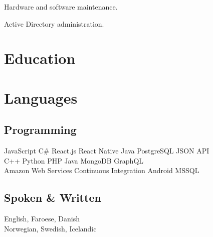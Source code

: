 \documentclass[]{deedy-resume-openfont}
\begin{document}
\begin{tightemize}
\item Hardware and software maintenance.
\item Active Directory administration.
\end{tightemize}
\sectionsep

\section{Education}
\sectionsep

\section{Languages}
\begin{minipage}[t]{.6\textwidth}
\subsection{Programming}
JavaScript \textbullet{} C\# \textbullet{} React.js \textbullet{} React Native \textbullet{} Java \textbullet{} PostgreSQL \textbullet{} JSON API \\
C++ \textbullet{} Python \textbullet{} PHP \textbullet{} Java \textbullet{} MongoDB \textbullet{} GraphQL \\
Amazon Web Services \textbullet{} Continuous Integration \textbullet{} Android \textbullet{} MSSQL
\sectionsep
\end{minipage}
\hfill
\begin{minipage}[t]{.35\textwidth}
\subsection{Spoken \& Written}
 English, Faroese, Danish\\
 Norwegian, Swedish, Icelandic\\
\end{minipage}
\end{document}
